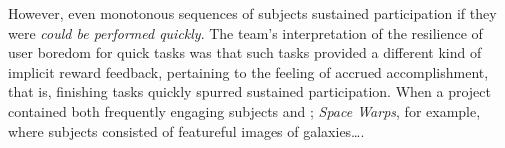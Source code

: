 \documentclass{sigchi}
\begin{document}


However, even monotonous sequences of subjects sustained participation if they were \emph{could be performed quickly}. The team's interpretation of the resilience of user boredom for quick tasks was that such tasks provided a different kind of implicit reward feedback, pertaining to the feeling of accrued accomplishment, that is, finishing tasks quickly spurred sustained participation.  When a project contained both frequently engaging subjects and ; \emph{Space Warps}, for example, where subjects consisted of featureful images of galaxies\ldots.





\end{document}
